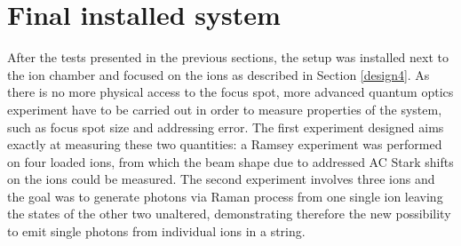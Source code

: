 \newpage
\section{Final installed system}
\label{sec:finalsetup}
After the tests presented in the previous sections, the setup was installed next to the ion chamber and focused on the ions as described in Section \ref{design4}. As there is no more physical access to the focus spot, more advanced quantum optics experiment have to be carried out in order to measure properties of the system, such as focus spot size and addressing error. The first experiment designed aims exactly at measuring these two quantities: a Ramsey experiment was performed on four loaded ions, from which the beam shape due to addressed AC Stark shifts on the ions could be measured.
The second experiment involves three ions and the goal was to generate photons via Raman process from one single ion leaving the states of the other two unaltered, demonstrating therefore the new possibility to emit single photons from individual ions in a string.

